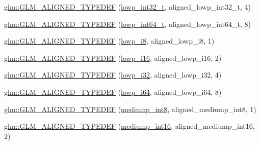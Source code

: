 \begin{DoxyCompactItemize}
\item 
\mbox{\hyperlink{group__gtx__type__aligned_ga8130ea381d76a2cc34a93ccbb6cf487d}{glm\+::\+G\+L\+M\+\_\+\+A\+L\+I\+G\+N\+E\+D\+\_\+\+T\+Y\+P\+E\+D\+EF}} (\mbox{\hyperlink{group__gtc__type__precision_gad9567c806dc39f534174eef42663119d}{lowp\+\_\+int32\+\_\+t}}, aligned\+\_\+lowp\+\_\+int32\+\_\+t, 4)
\item 
\mbox{\hyperlink{group__gtx__type__aligned_ga7ccb60f3215d293fd62b33b31ed0e7be}{glm\+::\+G\+L\+M\+\_\+\+A\+L\+I\+G\+N\+E\+D\+\_\+\+T\+Y\+P\+E\+D\+EF}} (\mbox{\hyperlink{group__gtc__type__precision_ga14d72e76d57c7f28eca8e933816c9fd6}{lowp\+\_\+int64\+\_\+t}}, aligned\+\_\+lowp\+\_\+int64\+\_\+t, 8)
\item 
\mbox{\hyperlink{group__gtx__type__aligned_gac20d508d2ef5cc95ad3daf083c57ec2a}{glm\+::\+G\+L\+M\+\_\+\+A\+L\+I\+G\+N\+E\+D\+\_\+\+T\+Y\+P\+E\+D\+EF}} (\mbox{\hyperlink{group__gtc__type__precision_gaa2e13ee29c90f75658beed6082541097}{lowp\+\_\+i8}}, aligned\+\_\+lowp\+\_\+i8, 1)
\item 
\mbox{\hyperlink{group__gtx__type__aligned_ga50257b48069a31d0c8d9c1f644d267de}{glm\+::\+G\+L\+M\+\_\+\+A\+L\+I\+G\+N\+E\+D\+\_\+\+T\+Y\+P\+E\+D\+EF}} (\mbox{\hyperlink{group__gtc__type__precision_gaf7bbfd31bcec25a416ea94d09efb5451}{lowp\+\_\+i16}}, aligned\+\_\+lowp\+\_\+i16, 2)
\item 
\mbox{\hyperlink{group__gtx__type__aligned_gaa07e98e67b7a3435c0746018c7a2a839}{glm\+::\+G\+L\+M\+\_\+\+A\+L\+I\+G\+N\+E\+D\+\_\+\+T\+Y\+P\+E\+D\+EF}} (\mbox{\hyperlink{group__gtc__type__precision_ga70fd34e8b8cffc92739161284ed77328}{lowp\+\_\+i32}}, aligned\+\_\+lowp\+\_\+i32, 4)
\item 
\mbox{\hyperlink{group__gtx__type__aligned_ga62601fc6f8ca298b77285bedf03faffd}{glm\+::\+G\+L\+M\+\_\+\+A\+L\+I\+G\+N\+E\+D\+\_\+\+T\+Y\+P\+E\+D\+EF}} (\mbox{\hyperlink{group__gtc__type__precision_ga1f4ded25f71c0f3b4518936d50b54b6e}{lowp\+\_\+i64}}, aligned\+\_\+lowp\+\_\+i64, 8)
\item 
\mbox{\hyperlink{group__gtx__type__aligned_gac8cff825951aeb54dd846037113c72db}{glm\+::\+G\+L\+M\+\_\+\+A\+L\+I\+G\+N\+E\+D\+\_\+\+T\+Y\+P\+E\+D\+EF}} (\mbox{\hyperlink{group__gtc__type__precision_ga3ee8faab2278c44c5785af04b7b18a14}{mediump\+\_\+int8}}, aligned\+\_\+mediump\+\_\+int8, 1)
\item 
\mbox{\hyperlink{group__gtx__type__aligned_ga78f443d88f438575a62b5df497cdf66b}{glm\+::\+G\+L\+M\+\_\+\+A\+L\+I\+G\+N\+E\+D\+\_\+\+T\+Y\+P\+E\+D\+EF}} (\mbox{\hyperlink{group__gtc__type__precision_ga4611997edb6c61606daa11990cf08798}{mediump\+\_\+int16}}, aligned\+\_\+mediump\+\_\+int16, 2)

\end{DoxyCompactItemize}

